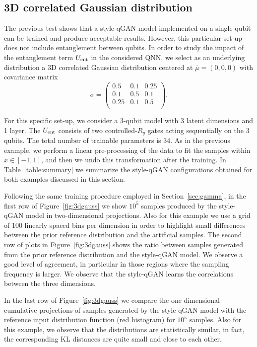 \documentclass[twocolumn,preprintnumbers,superscriptaddress]{revtex4-2}
\begin{document}
\subsection{3D correlated Gaussian distribution}

The previous test shows that a style-qGAN model implemented on a single qubit can be
trained and produce acceptable results. However, this particular set-up does not
include entanglement between qubits. In order to study the impact of the
entanglement term $U_{\rm ent}$ in the considered QNN, we select as an
underlying distribution a 3D correlated Gaussian distribution centered at
$\overline{\mu}=(0,0,0)$ with covariance matrix
\begin{equation}
  \sigma =
\begin{pmatrix}
  0.5 & 0.1 & 0.25\\
  0.1 & 0.5 & 0.1\\
  0.25 & 0.1 & 0.5\\
  \end{pmatrix}.
\end{equation}

For this specific set-up, we consider a 3-qubit model with 3 latent dimensions and
1 layer. The $U_{\rm ent}$ consists of two controlled-$R_{y}$ gates acting sequentially on the 3 qubits.
The total number of trainable parameters is 34. As in the previous example, we perform a linear pre-processing of the data to fit the samples within $x \in [-1, 1]$, and then we undo this transformation after the training. In Table~\ref{table:summary}
we summarize the style-qGAN configurations obtained for both examples discussed in
this section.

Following the same training procedure employed in Section~\ref{sec:gamma}, in
the first row of Figure~\ref{fig:3dgauss} we show $10^5$ samples produced by the
style-qGAN model in two-dimensional projections. Also for this example we use a
grid of 100 linearly spaced bins per dimension in order to highlight small
differences between the prior reference distribution and the artificial samples.
%
The second row of plots in Figure~\ref{fig:3dgauss} shows the ratio between
samples generated from the prior reference distribution and the style-qGAN model. We
observe a good level of agreement, in particular in those regions where the
sampling frequency is larger. We observe that the style-qGAN learns the correlations
between the three dimensions.

In the last row of Figure~\ref{fig:3dgauss} we compare the one dimensional
cumulative projections of samples generated by the style-qGAN model with the
reference input distribution function (red histogram) for $10^5$ samples. Also
for this example, we observe that the distributions are statistically similar,
in fact, the corresponding KL distances are quite small and close to each other.
\end{document}
